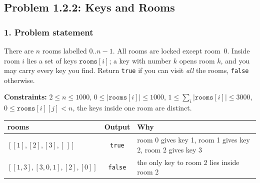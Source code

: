 \subsection{Problem 1.2.2: Keys and Rooms}


\subsubsection*{1. Problem statement}

There are $n$ rooms labelled $0..n-1$. All rooms are locked except room~$0$. Inside room $i$ lies a set of keys $\texttt{rooms}[i]$; a key with number $k$ opens room $k$, and you may carry every key you find. Return \texttt{true} if you can visit \emph{all} the rooms, \texttt{false} otherwise.

\textbf{Constraints:} $2 \le n \le 1000$, \; $0 \le |\texttt{rooms}[i]| \le 1000$, \; $1 \le \sum_i |\texttt{rooms}[i]| \le 3000$, \; $0 \le \texttt{rooms}[i][j] < n$, the keys inside one room are distinct.

\begin{table}[H]
\centering\small
\begin{tabular}{@{}lcl@{}}
\toprule
\textbf{rooms} & \textbf{Output} & \textbf{Why} \\
\midrule
$[[1],[2],[3],[\,]]$ & \texttt{true} & room 0 gives key 1, room 1 gives key 2, room 2 gives key 3 \\
$[[1,3],[3,0,1],[2],[0]]$ & \texttt{false} & the only key to room 2 lies inside room 2 \\
\bottomrule
\end{tabular}
\end{table}

